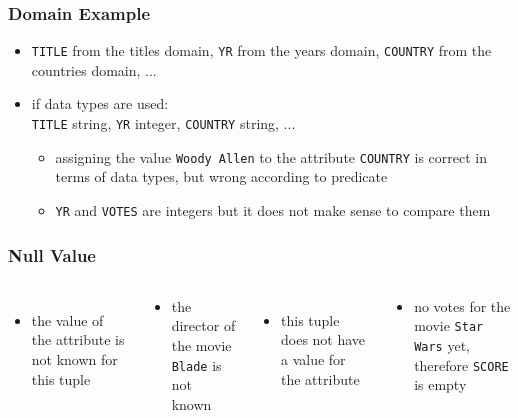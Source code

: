\documentclass[dvipsnames]{beamer}
\theoremstyle{plain}
\begin{document}
\begin{frame}
  \frametitle{Domain Example}

  \begin{example}
    \begin{itemize}
      \item \texttt{TITLE} from the titles domain, \texttt{YR} from the years
        domain, \texttt{COUNTRY} from the countries domain, ...

      \pause
      \item if data types are used:\\
        \texttt{TITLE} string, \texttt{YR} integer, \texttt{COUNTRY} string, ...

      \begin{itemize}
        \item assigning the value \texttt{Woody Allen} to the attribute \texttt{COUNTRY}
          is correct in terms of data types, but wrong according to predicate

        \item \texttt{YR} and \texttt{VOTES} are integers but it does not make sense
          to compare them
      \end{itemize}
    \end{itemize}
  \end{example}
\end{frame}

\begin{frame}
  \frametitle{Null Value}

  \begin{columns}[t]
    \begin{itemize}
      \item the value of the attribute is not known for this tuple
    \end{itemize}

    \begin{example}
      \begin{itemize}
        \item the director of the movie \texttt{Blade} is not known
      \end{itemize}
    \end{example}

    \pause
    \begin{itemize}
      \item this tuple does not have a value for the attribute
    \end{itemize}

    \begin{example}
      \begin{itemize}
        \item no votes for the movie \texttt{Star Wars} yet, therefore
          \texttt{SCORE} is empty
      \end{itemize}
    \end{example}
  \end{columns}
\end{frame}
\end{document}
